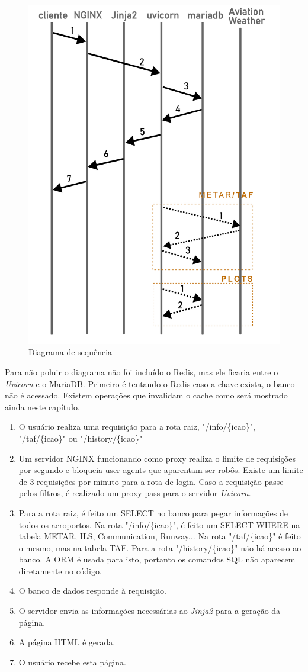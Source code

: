 \begin{figure}[H]
    \begin{center}
    \includegraphics[width=0.5\linewidth]{img/diagrama-tempo.png}
    \caption{Diagrama de sequência}
    \label{fig:tempo}
    \end{center}
\end{figure}

Para não poluir o diagrama não foi incluído o Redis, mas ele ficaria entre
o \textit{Uvicorn} e o MariaDB. Primeiro é tentando o Redis caso a chave exista, o banco
não é acessado. Existem operações que invalidam o cache como será mostrado
ainda neste capítulo.

\begin{enumerate}
\item O usuário realiza uma requisição para a rota raiz, "/info/\{icao\}", "/taf/\{icao\}"
ou "/history/\{icao\}"
\item Um servidor NGINX funcionando como proxy realiza o limite de requisições por segundo
e bloqueia user-agents que aparentam ser robôs. Existe um limite de 3 requisições por
minuto para a rota de login. Caso a requisição passe pelos filtros, é
realizado um proxy-pass para o servidor \textit{Uvicorn}.
\item Para a rota raiz, é feito um SELECT no banco para pegar informações de todos os
aeroportos. Na rota "/info/\{icao\}", é feito um SELECT-WHERE na tabela METAR, ILS, Communication, Runway...
Na rota "/taf/\{icao\}" é feito o mesmo, mas na tabela TAF. Para a rota "/history/\{icao\}"
não há acesso ao banco.
A ORM é usada para isto, portanto os comandos SQL não aparecem diretamente no código.
\item O banco de dados responde à requisição.
\item O servidor envia as informações necessárias ao \textit{Jinja2} para a geração da página.
\item A página HTML é gerada.
\item O usuário recebe esta página.
\end{enumerate}

